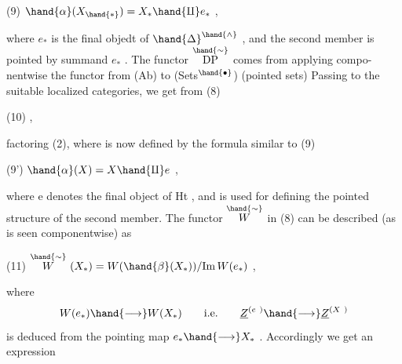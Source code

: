 
(9) \qquad $\hand{\alpha}(X_{\hand{*}}) = X_* \hand{\amalg} e_*$ \qquad ,

where $e_*$ is the  final objedt of $\hand{\Delta}^{\hand{\wedge}}$ , and the second member is
pointed by  summand $e_*$ . The functor $\overset{\hand{\sim}}{\mathrm{DP}}$ comes from applying compo-%
nentwise the  functor from (Ab) to (Sets$^\hand{\bullet}$) (pointed sets)  Passing to
the suitable localized categories, we get from (8)

(10)  \qquad ,

factoring (2), where \hand{$\alpha$} is now defined by the formula similar to (9)

(9') \qquad $\hand{\alpha}(X) = X \hand{\amalg} e$ \quad ,

where e denotes the final object of Ht , and is used for defining the
pointed structure of the second member. The functor $\overset{\hand{\sim}}{W}$ in (8) can be
described (as is seen componentwise) as

(11) \qquad $\overset{\hand{\sim}}{W}\ (X_*) = W(\hand{\beta}(X_*))/ \mathrm{Im}\, W(e_*)$ \quad ,

where
\[ W(e_*) \hand{\longrightarrow} W(X_*) \qquad \text{i.e.} \qquad \underline{Z}^{(e\ )} \hand{\longrightarrow} \underline{Z}^{(X\ )} \]
is deduced from the pointing map $e_* \hand{\longrightarrow} X_*$ . Accordingly we get
an expression

